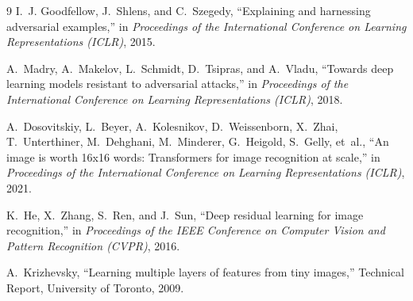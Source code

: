 \documentclass[12pt, a4paper]{article}
\begin{document}
\begin{thebibliography}{9}
I.~J. Goodfellow, J.~Shlens, and C.~Szegedy,
``Explaining and harnessing adversarial examples,''
in \emph{Proceedings of the International Conference on Learning
Representations (ICLR)}, 2015.

A.~Madry, A.~Makelov, L.~Schmidt, D.~Tsipras, and A.~Vladu,
``Towards deep learning models resistant to adversarial attacks,''
in \emph{Proceedings of the International Conference on Learning
Representations (ICLR)}, 2018.

A.~Dosovitskiy, L.~Beyer, A.~Kolesnikov, D.~Weissenborn, X.~Zhai,
T.~Unterthiner, M.~Dehghani, M.~Minderer, G.~Heigold, S.~Gelly, et~al.,
``An image is worth 16x16 words: Transformers for image recognition at
scale,'' in \emph{Proceedings of the International Conference on Learning
Representations (ICLR)}, 2021.

K.~He, X.~Zhang, S.~Ren, and J.~Sun,
``Deep residual learning for image recognition,''
in \emph{Proceedings of the IEEE Conference on Computer Vision and
Pattern Recognition (CVPR)}, 2016.

A.~Krizhevsky,
``Learning multiple layers of features from tiny images,''
Technical Report, University of Toronto, 2009.
\end{thebibliography}
\end{document}
